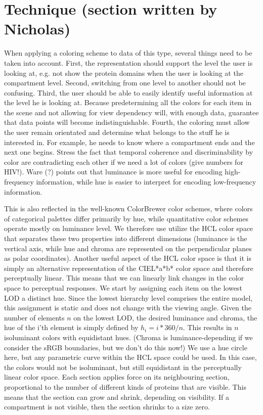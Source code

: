 \documentclass[review,journal]{vgtc}         %
\begin{document}
\section{Technique (section written by Nicholas)}

When applying a coloring scheme to data of this type, several things need to be taken into account. 
First, the representation should support the level the user is looking at, e.g. not show the protein domains when the user is looking at the compartment level. 
Second, switching from one level to another should not be confusing.
Third, the user should be able to easily identify useful information at the level he is looking at. 
Because predetermining all the colors for each item in the scene and not allowing for view dependency will, with enough data, guarantee that data points will become indistinguishable. 
Fourth, the coloring must allow the user remain orientated and determine what belongs to the stuff he is interested in. 
For example, he needs to know where a compartment ends and the next one begins.
Stress the fact that temporal coherence and discriminability by color are contradicting each other if we need a lot of colors (give numbers for HIV!). 
Ware (?) points out that luminance is more useful for encoding high-frequency information, while hue is easier to interpret for encoding low-frequency information. 

This is also reflected in the well-known ColorBrewer color schemes, where colors of categorical palettes differ primarily by hue, while quantitative color schemes operate mostly on luminance level.  
We therefore use utilize the HCL color space that separates these two properties into different dimensions (luminance is the vertical axis, while hue and chroma are represented on the perpendicular planes as polar coordinates). 
Another useful aspect of the HCL color space is that it is simply an alternative representation of the CIEL*a*b* color space and therefore perceptually linear. 
This means that we can linearly link changes in the color space to perceptual responses. 
We start by assigning each item on the lowest LOD a distinct hue. 
Since the lowest hierarchy level comprises the entire model, this assignment is static and does not change with the viewing angle. 
Given the number of elements $n$ on the lowest LOD, the desired luminance and chroma, the hue of the i’th element is simply defined by $h_i=i*360/n$. 
This results in $n$ isoluminant colors with equidistant hues. 
(Chroma is luminance-depending if we consider the sRGB boundaries, but we don’t do this now!)
We use a hue circle here, but any parametric curve within the HCL space could be used. 
In this case, the colors would not be isoluminant, but still equidistant in the perceptually linear color space. 
Each section applies force on its neighbouring section, proportional to the number of different kinds of proteins that are visible. 
This means that the section can grow and shrink, depending on visibility. If a compartment is not visible, then the section shrinks to a size zero. 
\end{document}
